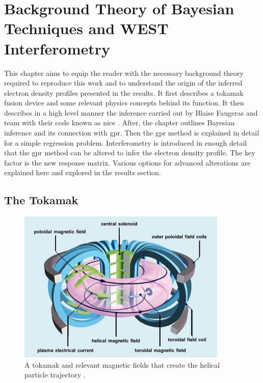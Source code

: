\chapter{Background Theory of Bayesian Techniques and WEST Interferometry}

This chapter aims to equip the reader with the necessary background theory required to reproduce this work and to understand the origin of the inferred electron density profiles presented in the results. It first describes a tokamak fusion device and some relevant physics concepts behind its function. It then describes in a high level manner the inference carried out by Blaise Faugeras and team with their code known as \gls{nice} \cite{nice}. After, the chapter outlines Bayesian inference and its connection with \gls{gpr}. Then the \gls{gpr} method is explained in detail for a simple regression problem. Interferometry is introduced in enough detail that the \gls{gpr} method can be altered to infer the electron density profile. The key factor is the new response matrix. Various options for advanced alterations are explained here and explored in the results section.

\section{The Tokamak}

\begin{figure}[H]
  \centering
  \includegraphics[width=10cm]{images/tokamak.jpg}
  \caption{A tokamak and relevant magnetic fields that create the helical particle trajectory \cite{tokamakSchema}.}
  \label{fig:tokamakSchema}
\end{figure}


